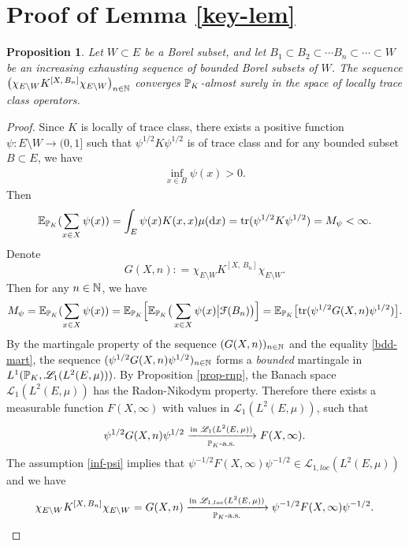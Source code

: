 \documentclass[12pt]{paper}
\newtheorem{proposition}[theorem]{Proposition}
\numberwithin{theorem}{section}
\numberwithin{figure}{section}
\numberwithin{equation}{section}
\begin{document}
\section{Proof of Lemma \ref{key-lem}}





\begin{proposition}\label{prop-RNP}
Let $W\subset E$ be a Borel subset, and let $B_1 \subset B_2 \subset \cdots B_n\subset \cdots \subset W $ be an increasing exhausting sequence of bounded Borel subsets of  $W$.  The sequence $\big( \chi_{E\setminus W}  K^{[X, \, B_n]} \chi_{E\setminus W}  \big)_{n\in \mathbb{N}}$
converges $\mathbb{P}_K$-almost surely in the space of locally trace class operators.
\end{proposition}


\begin{proof}
Since $K$ is locally of trace class, there exists a positive function $\psi: E\setminus W \rightarrow (0, 1]$ such that $\psi^{1/2}K \psi^{1/2} $ is of trace class and for any bounded subset $B\subset E$, we have
\begin{align}\label{inf-psi}
\inf_{x\in B} \psi(x)>0.
\end{align}
Then
\[
\mathbb{E}_{\mathbb{P}_K}(\sum_{x\in X}\psi(x)  ) =  \int_{E}   \psi(x) K(x, x) \mu(\mathrm{d} x) = \mathrm{tr}(\psi^{1/2} K \psi^{1/2} )= M_\psi< \infty.
\]
Denote
\[
G(X, n): = \chi_{E\setminus W}  K^{[X, \, B_n]} \chi_{E\setminus W}.
\]
Then for any $n\in\mathbb{N}$, we have
\begin{align}\label{bdd-mart}
M_\psi=  \mathbb{E}_{\mathbb{P}_K}(\sum_{x\in X}\psi(x)  )   = \mathbb{E}_{\mathbb{P}_K}\Big[\mathbb{E}_{\mathbb{P}_K} \big(    \sum_{x\in X}\psi(x)  \big| \mathcal{F}( B_n)\big) \Big]  =  \mathbb{E}_{\mathbb{P}_K}\big[ \mathrm{tr}(\psi^{1/2} G(X, n)  \psi^{1/2}  )\big].
\end{align}
By the martingale property of the sequence $(G(X, n))_{n\in\mathbb{N}}$ and the equality \eqref{bdd-mart}, the sequence $(\psi^{1/2} G (X, n)  \psi^{1/2})_{n\in\mathbb{N}}$ forms a {\it bounded} martingale in $L^1(\mathbb{P}_K,  \mathscr{L}_1(L^2(E, \mu)))$.  By Proposition \ref{prop-rnp}, the Banach space $\mathscr{L}_1(L^2(E, \mu))$ has  the Radon-Nikodym property. Therefore there exists a measurable function $F (X, \infty)$ with values in  $\mathscr{L}_1(L^2(E, \mu))$, such that
\[
\psi^{1/2} G(X, n)  \psi^{1/2} \xrightarrow[\text{$\mathbb{P}_K$-a.s.}]{\text{in $\mathscr{L}_1(L^2(E, \mu))$}} F(X, \infty).
\]
The assumption \eqref{inf-psi} implies that $ \psi^{-1/2} F(X, \infty)  \psi^{-1/2} \in \mathscr{L}_{1, loc}(L^2(E, \mu))$ and we have
\begin{align}\label{kernel-limit}
\chi_{E\setminus W}  K^{[X, \, B_n]} \chi_{E\setminus W} = G (X, n)  \xrightarrow[ \text{$\mathbb{P}_K$-a.s.}]{\text{in $\mathscr{L}_{1, loc}(L^2(E, \mu))$}}  \psi^{-1/2} F(X, \infty)  \psi^{-1/2}.
\end{align}
\end{proof}
\end{document}
